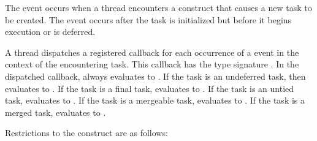 \events

The  event occurs when a thread encounters a construct
that causes a new task to be created.
The event occurs after the task is initialized but before
it begins execution or is deferred.

\tools

A thread dispatches a registered 
callback for each occurrence of a  event
in the context of the encountering task.
This callback has the type signature    .
In the dispatched callback,             \code{(}  always evaluates to .
If the task is an undeferred task, then \code{(}  evaluates to .
If the task is a final task,            \code{(}  evaluates to .
If the task is an untied task,          \code{(}  evaluates to .
If the task is a mergeable task,        \code{(}  evaluates to .
If the task is a merged task,           \code{(}  evaluates to .

\restrictions
Restrictions to the  construct are as follows:

